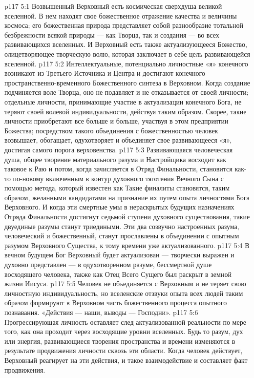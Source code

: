 \vs p117 5:1 Возвышенный Верховный есть космическая сверхдуша великой вселенной. В нем находят свое божественное отражение качества и величины космоса; его божественная природа представляет собой разнообразие тотальной безбрежности всякой природы --- как Творца, так и создания --- во всех развивающихся вселенных. И Верховный есть также актуализующееся Божество, олицетворяющее творческую волю, которая заключает в себе цель развивающейся вселенной.
\vs p117 5:2 Интеллектуальные, потенциально личностные «я» конечного возникают из Третьего Источника и Центра и достигают конечного пространственно\hyp{}временного Божественного синтеза в Верховном. Когда создание подчиняется воле Творца, оно не подавляет и не отказывается от своей личности; отдельные личности, принимающие участие в актуализации конечного Бога, не теряют своей волевой индивидуальности, действуя таким образом. Скорее, такие личности приобретают все больше и больше, участвуя в этом предприятии Божества; посредством такого объединения с божественностью человек возвышает, обогащает, одухотворяет и объединяет свое развивающееся «я», достигая самого порога верховенства.
\vs p117 5:3 \pc Развивающаяся человеческая душа, общее творение материального разума и Настройщика восходит как таковое к Раю и потом, когда зачисляется в Отряд Финальности, становится как\hyp{}то по\hyp{}новому включенным в контур духовного тяготения Вечного Сына с помощью метода, который известен как  Такие финалиты становятся, таким образом, желанными кандидатами на признание их путем опыта личностями Бога Верховного. И когда эти смертные умы в нераскрытых будущих назначениях Отряда Финальности достигнут седьмой ступени духовного существования, такие двуединые разумы станут триедиными. Эти два созвучно настроенных разума, человеческий и божественный, станут прославлены в объединении с опытным разумом Верховного Существа, к тому времени уже актуализованного.
\vs p117 5:4 В вечном будущем Бог Верховный будет актуализован --- творчески выражен и духовно представлен --- в одухотворенном разуме, бессмертной душе восходящего человека, также как Отец Всего Сущего был раскрыт в земной жизни Иисуса.
\vs p117 5:5 \pc Человек не объединяется с Верховным и не теряет свою личностную индивидуальность, но вселенские отзвуки опыта всех людей таким образом формируют в Верховном часть божественного процесса опытного познавания. «Действия --- наши, выводы --- Господни».
\vs p117 5:6 Прогрессирующая личность оставляет след актуализованной реальности по мере того, как она проходит через восходящие уровни вселенных. Будь то разум, дух или энергия, развивающиеся творения пространства и времени изменяются в результате продвижения личности сквозь эти области. Когда человек действует, Верховный реагирует на эти действия, и такое взаимодействие и составляет факт продвижения.
